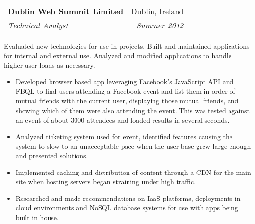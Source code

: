 \documentclass[11pt]{article}
\makeatletter
\newenvironment{resumeSubSectionHeader}{
    \par
    \begin{tabular*}{\textwidth}{l@{\extracolsep{\fill}}r}
    \par
} {
    \end{tabular*}
    \par
}
\newenvironment{resumeSubSectionBody}{
    \par
    \vspace{-0.8\parskip}
    \begin{small}
    \par
} {
    \par
    \end{small}
    \par
}
\makeatother
\begin{document}
%
%
\begin{resumeSubSectionHeader}

    \textbf{Dublin Web Summit Limited} & Dublin, Ireland   \\
    \emph{Technical Analyst}           & \emph{Summer 2012}

\end{resumeSubSectionHeader}
\begin{resumeSubSectionBody}

    Evaluated new technologies for use in projects.
    Built and maintained applications for internal and external use.
    Analyzed and modified applications to handle higher user loads
    as necessary.

    \begin{itemize}
        \item
            Developed browser based app leveraging Facebook's
            JavaScript API and FBQL to find users attending a Facebook event
            and list them in order of mutual friends with the current user,
            displaying those mutual friends, and showing which of them
            were also attending the event.
            This was tested against an event of about 3000 attendees and
            loaded results in several seconds.

        \item
            Analyzed ticketing system used for event, identified features
            causing the system to slow to an unacceptable pace when the
            user base grew large enough and presented solutions.

        \item
            Implemented caching and distribution of content through a CDN
            for the main site when hosting servers began straining under
            high traffic.

        \item
            Researched and made recommendations on IaaS platforms,
            deployments in cloud environments
            and NoSQL database systems for use with apps being built in
            house.
    \end{itemize}

\end{resumeSubSectionBody}
\end{document}
